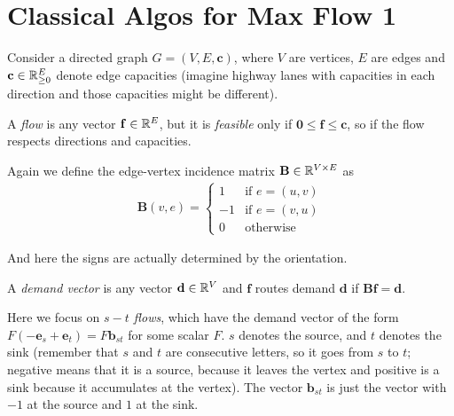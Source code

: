 


\section{Classical Algos for Max Flow 1}



\begin{definicija}
    Consider a directed graph $G = (V,E,\mathbf{c})$, where $V$ are vertices, $E$ are edges and $\mathbf{c} \in \mathbb{R}_{\geq0}^E$ denote edge capacities (imagine highway lanes with capacities in each direction and those capacities might be different).

    A \emph{flow} is any vector $\mathbf{f} \in \mathbb{R}^E$, but it is \emph{feasible} only if $\mathbf{0} \leq \mathbf{f} \leq \mathbf{c}$, so if the flow respects directions and capacities.

    Again we define the edge-vertex incidence matrix $\mathbf{B} \in \mathbb{R}^{V \times E}$ as 
    \begin{align*}
        \mathbf{B}(v, e) = \begin{cases} 
            1 & \text{if } e = (u,v) \\
            -1 & \text{if } e = (v, u)\\
            0 & \text{otherwise}
        \end{cases}
    \end{align*}

    And here the signs are actually determined by the orientation.

    A \emph{demand vector} is any vector $\mathbf{d} \in \mathbb{R}^V$ and $\mathbf{f}$ routes demand $\mathbf{d}$ if $\mathbf{B}\mathbf{f} = \mathbf{d}$.

    Here we focus on \emph{$s-t$ flows}, which have the demand vector of the form $F(-\mathbf{e}_s + \mathbf{e}_t) = F \mathbf{b}_{st}$ for some scalar $F$. $s$ denotes the source, and $t$ denotes the sink (remember that $s$ and $t$ are consecutive letters, so it goes from $s$ to $t$; negative means that it is a source, because it leaves the vertex and positive is a sink because it accumulates at the vertex). The vector $\mathbf{b}_{st}$ is just the vector with $-1$ at the source and $1$ at the sink.
\end{definicija}


